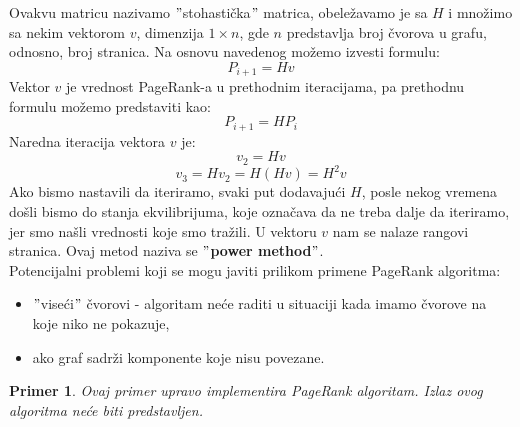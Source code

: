 \documentclass[a4paper]{article}
\newtheorem{primer}{Primer}[section]
\begin{document}
Ovakvu matricu nazivamo $"$stohastička$"$ matrica, obeležavamo je sa $H$ i množimo sa nekim vektorom $v$, dimenzija $1 \times n$, gde $n$ predstavlja broj čvorova u grafu, odnosno, broj stranica. Na osnovu navedenog možemo izvesti formulu:
\begin{equation}
P_{i+1} = Hv
\end{equation}
Vektor $v$ je vrednost PageRank-a u prethodnim iteracijama, pa prethodnu formulu možemo predstaviti kao:
\begin{equation}
P_{i+1} = HP_i
\end{equation}
Naredna iteracija vektora $v$ je:
\begin{equation}
v_2 = Hv
\end{equation}
\begin{equation}
v_3 = Hv_2 = H(Hv) = H^2v
\end{equation}
Ako bismo nastavili da iteriramo, svaki put dodavajući $H$, posle nekog vremena došli bismo do stanja ekvilibrijuma, koje označava da ne treba dalje da iteriramo, jer smo našli vrednosti koje smo tražili. U vektoru $v$ nam se nalaze rangovi stranica. Ovaj metod naziva se \textbf{$"$power method$"$}.\\
Potencijalni problemi koji se mogu javiti prilikom primene PageRank algoritma:
\begin{itemize}
\item $"$viseći$"$ čvorovi - algoritam neće raditi u situaciji kada imamo čvorove na koje niko ne pokazuje,
\item ako graf sadrži komponente koje nisu povezane.
\end{itemize} 
\begin{primer} 
Ovaj primer upravo implementira PageRank algoritam. Izlaz ovog algoritma neće biti predstavljen.
\inputminted{python}{Codes/2/3-pagerank.py}
\end{primer}


\appendix
 

\end{document}
